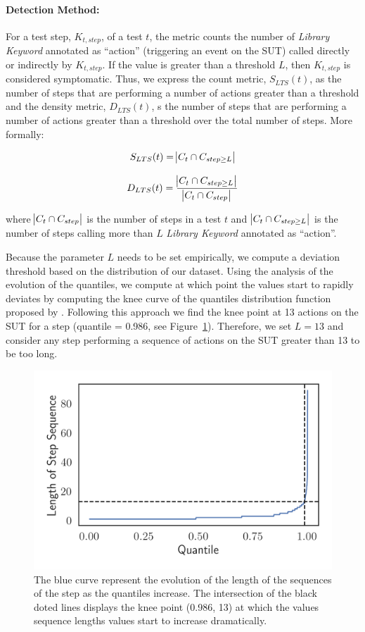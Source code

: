 \paragraph{Detection Method:}

For a test step, $K_{t, step}$, of a test $t$, the metric counts the number of \emph{Library Keyword} annotated as ``action'' (triggering an event on the SUT) called directly or indirectly by $K_{t, step}$. If the value is greater than a threshold $L$, then $K_{t, step}$ is considered symptomatic. Thus, we express the count metric, $S_{LTS}(t)$, as the number of steps that are performing a number of actions greater than a threshold and the density metric, $D_{LTS}(t)$, s the number of steps that are performing a number of actions greater than a threshold over the total number of steps. More formally:

\begin{equation*}
    S_{LTS}(t) = \abs{C_t \cap C_{step \geq L}}
\end{equation*}

\begin{equation*}
    D_{LTS}(t) = \frac{\abs{C_t \cap C_{step \geq L}}}{\abs{C_t \cap C_{step}}}
\end{equation*}

where $\abs{C_t \cap C_{step}}$ is the number of steps in a test $t$ and $\abs{C_t \cap C_{step \geq L}}$ is the number of steps calling more than $L$ \emph{Library Keyword} annotated as ``action''. 

Because the parameter $L$ needs to be set empirically, we compute a deviation threshold based on the distribution of our dataset. Using the analysis of the evolution of the quantiles, we compute at which point the values start to rapidly deviates by computing the knee curve of the quantiles distribution function proposed by \cite{Satopaa2011}. Following this approach we find the knee point at 13 actions on the SUT for a step (quantile = 0.986, see Figure~\ref{fig:step-sequences-quantiles}). Therefore, we set $L = 13$  and consider any step performing a sequence of actions on the SUT greater than 13 to be too long.

\begin{figure}
\centering
\includegraphics[width=0.6\linewidth]{figures/smells/step-sequences-quantiles.png}
\caption{The blue curve represent the evolution of the length of the sequences of the step as the quantiles increase. The intersection of the black doted lines displays the knee point (0.986, 13) at which the values sequence lengths values start to increase dramatically.}  
\label{fig:step-sequences-quantiles}
\end{figure}


